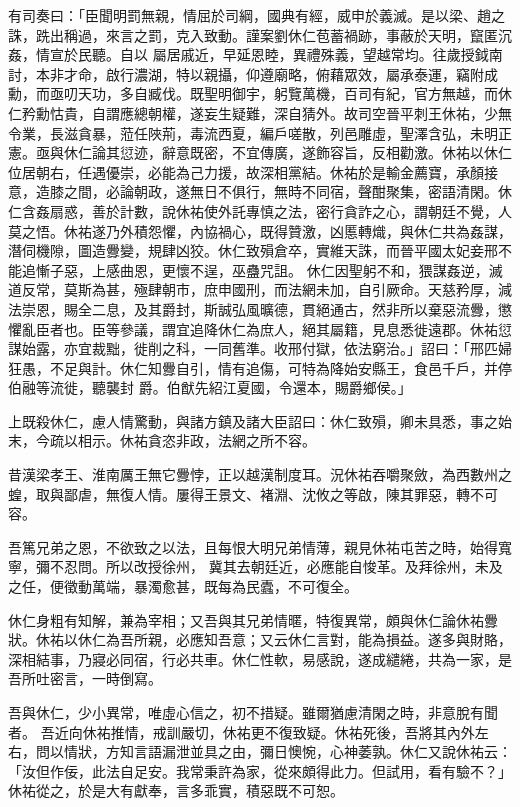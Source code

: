 \begin{pinyinscope}
 有司奏曰：「臣聞明罰無親，情屈於司綱，國典有經，威申於義滅。是以梁、趙之誅，跣出稱過，來言之罰，克入致動。謹案劉休仁苞蓄禍跡，事蔽於天明，竄匿沉姦，情宣於民聽。自以
 屬居戚近，早延恩睦，異禮殊義，望越常均。往歲授鉞南討，本非才命，啟行濃湖，特以親攝，仰遵廟略，俯藉眾效，屬承泰運，竊附成勳，而亟叨天功，多自臧伐。既聖明御宇，躬覽萬機，百司有紀，官方無越，而休仁矜勳怙貴，自謂應總朝權，遂妄生疑難，深自猜外。故司空晉平刺王休祐，少無令業，長滋貪暴，蒞任陜荊，毒流西夏，編戶嗟散，列邑雕虛，聖澤含弘，未明正憲。亟與休仁論其愆迹，辭意既密，不宜傳廣，遂飾容旨，反相勸激。休祐以休仁
 位居朝右，任遇優崇，必能為己力援，故深相黨結。休祐於是輸金薦寶，承顏接意，造膝之間，必論朝政，遂無日不俱行，無時不同宿，聲酣聚集，密語清閑。休仁含姦扇惑，善於計數，說休祐使外託專慎之法，密行貪詐之心，謂朝廷不覺，人莫之悟。休祐遂乃外積怨懼，內協禍心，既得贊激，凶慝轉熾，與休仁共為姦謀，潛伺機隙，圖造釁變，規肆凶狡。休仁致殞倉卒，實維天誅，而晉平國太妃妾邢不能追慚子惡，上感曲恩，更懷不逞，巫蠱咒詛。
 休仁因聖躬不和，猥謀姦逆，滅道反常，莫斯為甚，殛肆朝市，庶申國刑，而法網未加，自引厥命。天慈矜厚，減法崇恩，賜全二息，及其爵封，斯誠弘風曠德，貫絕通古，然非所以棄惡流釁，懲懼亂臣者也。臣等參議，謂宜追降休仁為庶人，絕其屬籍，見息悉徙遠郡。休祐愆謀始露，亦宜裁黜，徙削之科，一同舊準。收邢付獄，依法窮治。」詔曰：「邢匹婦狂愚，不足與計。休仁知釁自引，情有追傷，可特為降始安縣王，食邑千戶，并停伯融等流徙，聽襲封
 爵。伯猷先紹江夏國，令還本，賜爵鄉侯。」



 上既殺休仁，慮人情驚動，與諸方鎮及諸大臣詔曰：休仁致殞，卿未具悉，事之始末，今疏以相示。休祐貪恣非政，法網之所不容。



 昔漢梁孝王、淮南厲王無它釁悖，正以越漢制度耳。況休祐吞嚼聚斂，為西數州之蝗，取與鄙虐，無復人情。屢得王景文、褚淵、沈攸之等啟，陳其罪惡，轉不可容。



 吾篤兄弟之恩，不欲致之以法，且每恨大明兄弟情薄，親見休祐屯苦之時，始得寬寧，彌不忍問。所以改授徐州，
 冀其去朝廷近，必應能自悛革。及拜徐州，未及之任，便徵動萬端，暴濁愈甚，既每為民蠹，不可復全。



 休仁身粗有知解，兼為宰相；又吾與其兄弟情暱，特復異常，頗與休仁論休祐釁狀。休祐以休仁為吾所親，必應知吾意；又云休仁言對，能為損益。遂多與財賂，深相結事，乃寢必同宿，行必共車。休仁性軟，易感說，遂成繾綣，共為一家，是吾所吐密言，一時倒寫。



 吾與休仁，少小異常，唯虛心信之，初不措疑。雖爾猶慮清閑之時，非意脫有聞者。
 吾近向休祐推情，戒訓嚴切，休祐更不復致疑。休祐死後，吾將其內外左右，問以情狀，方知言語漏泄並具之由，彌日懊惋，心神萎孰。休仁又說休祐云：「汝但作佞，此法自足安。我常秉許為家，從來頗得此力。但試用，看有驗不？」休祐從之，於是大有獻奉，言多乖實，積惡既不可恕。




\end{pinyinscope}
